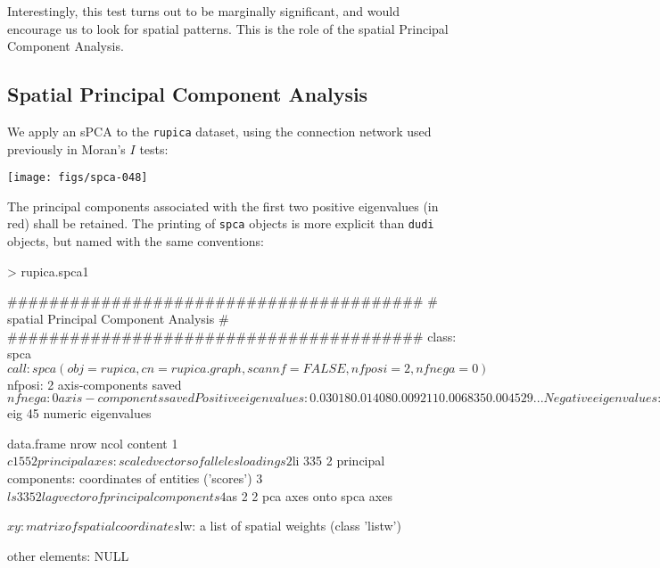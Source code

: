 \documentclass{article}
\begin{document}
\noindent Interestingly, this test turns out to be marginally significant, and would encourage us to
look for spatial patterns. This is the role of the spatial Principal Component Analysis.





\subsection{Spatial Principal Component Analysis}

We apply an sPCA to the \texttt{rupica} dataset, using the connection network used previously in
Moran's $I$ tests:
\begin{Schunk}
\end{Schunk}
\texttt{[image: figs/spca-048]}

\noindent The principal components associated with the first two
positive eigenvalues (in red) shall be retained.
The printing of \texttt{spca} objects is more explicit than
\texttt{dudi} objects, but named with the same conventions:
\begin{Schunk}
\begin{Sinput}
> rupica.spca1
\end{Sinput}
\begin{Soutput}
	########################################
	# spatial Principal Component Analysis #
	########################################
class: spca
$call: spca(obj = rupica, cn = rupica.graph, scannf = FALSE, nfposi = 2, 
    nfnega = 0)

$nfposi: 2 axis-components saved
$nfnega: 0 axis-components saved
Positive eigenvalues: 0.03018 0.01408 0.009211 0.006835 0.004529 ...
Negative eigenvalues: -0.008611 -0.006414 -0.004451 -0.003963 -0.003329 ...

  vector length mode    content    
1 $eig   45     numeric eigenvalues

  data.frame nrow ncol content                                                 
1 $c1        55   2    principal axes: scaled vectors of alleles loadings      
2 $li        335  2    principal components: coordinates of entities ('scores')
3 $ls        335  2    lag vector of principal components                      
4 $as        2    2    pca axes onto spca axes                                 

$xy: matrix of spatial coordinates
$lw: a list of spatial weights (class 'listw')

other elements: NULL
\end{Soutput}
\end{Schunk}
\end{document}
